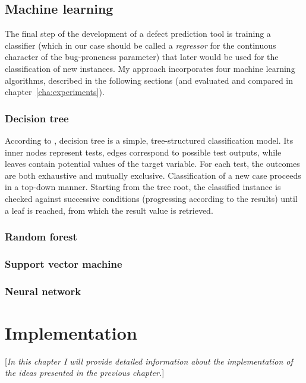 \documentclass{pracamgr}
\begin{document}
\section{Machine learning}
\label{sec:machine_learning}
The final step of the development of a defect prediction tool is training a classifier (which in our case should be called a \emph{regressor} for the continuous character of the bug-proneness parameter) that later would be used for the classification of new instances. My approach incorporates four machine learning algorithms, described in the following sections (and evaluated and compared in chapter~\ref{cha:experiments}).

\subsection{Decision tree}
\label{sec:decision_tree}
According to \cite[p. 263]{encyclopedia}, decision tree is a simple, tree-structured classification model. Its inner nodes represent tests, edges correspond to possible test outputs, while leaves contain potential values of the target variable. For each test, the outcomes are both exhaustive and mutually exclusive. Classification of a new case proceeds in a top-down manner. Starting from the tree root, the classified instance is checked against successive conditions (progressing according to the results) until a leaf is reached, from which the result value is retrieved.

\subsection{Random forest}
\label{sec:random_forest}

\subsection{Support vector machine}
\label{sec:svm}

\subsection{Neural network}
\label{sec:neural_net}

\chapter{Implementation}
\label{cha:implementation}
[\textit{In this chapter I will provide detailed information about the implementation of the ideas presented in the previous chapter.}]
\end{document}
